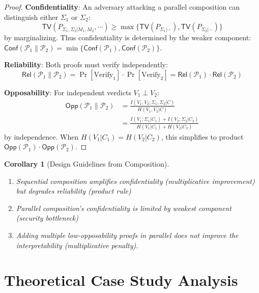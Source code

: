 \documentclass{ieeeaccess}
\newtheorem{corollary}{Corollary}[subsection]
\newtheorem{proof}{Proof}[section]
\begin{document}
\begin{proof}
\textbf{Confidentiality}: An adversary attacking a parallel composition can distinguish either $\Sigma_1$ or $\Sigma_2$:
\begin{equation}
\mathsf{TV}(P_{\Sigma_1,\Sigma_2|M_1,M_2}, \cdots) \geq \max\{\mathsf{TV}(P_{\Sigma_1|\cdots}), \mathsf{TV}(P_{\Sigma_2|\cdots})\}
\end{equation}
by marginalizing. Thus confidentiality is determined by the weaker component: $\mathsf{Conf}(\mathcal{P}_1 \| \mathcal{P}_2) = \min\{\mathsf{Conf}(\mathcal{P}_1), \mathsf{Conf}(\mathcal{P}_2)\}$.

\textbf{Reliability}: Both proofs must verify independently:
\begin{equation}
\mathsf{Rel}(\mathcal{P}_1 \| \mathcal{P}_2) = \Pr[\text{Verify}_1] \cdot \Pr[\text{Verify}_2] = \mathsf{Rel}(\mathcal{P}_1) \cdot \mathsf{Rel}(\mathcal{P}_2)
\end{equation}

\textbf{Opposability}: For independent verdicts $V_1 \perp V_2$:
\begin{align*}
\mathsf{Opp}(\mathcal{P}_1 \| \mathcal{P}_2) &= \frac{I(V_1,V_2; \Sigma_1,\Sigma_2|C)}{H(V_1,V_2|C)} \\
&= \frac{I(V_1;\Sigma_1|C_1) + I(V_2;\Sigma_2|C_2)}{H(V_1|C_1) + H(V_2|C_2)}
\end{align*}
by independence. When $H(V_1|C_1) = H(V_2|C_2)$, this simplifies to product $\mathsf{Opp}(\mathcal{P}_1) \cdot \mathsf{Opp}(\mathcal{P}_2)$.
\end{proof}



\begin{corollary}[Design Guidelines from Composition]
\begin{enumerate}
\item Sequential composition amplifies confidentiality (multiplicative improvement) but degrades reliability (product rule)
\item Parallel composition's confidentiality is limited by weakest component (security bottleneck)
\item Adding multiple low-opposability proofs in parallel does not improve the interpretability (multiplicative penalty).
\end{enumerate}
\end{corollary}

\section{Theoretical Case Study Analysis}\label{sec:validation}
\end{document}
